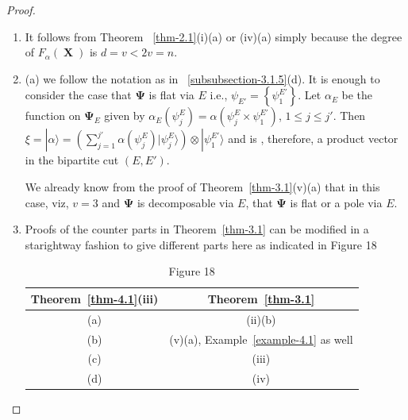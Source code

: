 \documentclass[a4paper,12pt]{article}
\DeclareMathOperator{\x}{\mathrm{X}}
\theoremstyle{definition}
\theoremstyle{underlinethm}
\theoremstyle{definition}
\begin{document}
\begin{proof}
\begin{enumerate}[label=(\roman*)]
\item It follows from Theorem ~\eqref{thm-2.1}(i)(a) or (iv)(a) simply because the degree of $F_{\alpha}(\boldsymbol{\x})$ is $d=v < 2v = n$.

\item (a) we follow the notation as in ~\eqref{subsubsection-3.1.5}(d). It is enough to consider the case that $\boldsymbol{\Psi}$ is flat via $E$ i.e., $\psi_{E'}= \left\{\psi^{E'}_{1}\right\}$. Let $\alpha_{E}$ be the function on $\boldsymbol{\Psi}_{E}$ given by $\alpha_{E}\left(\psi_{j}^{E}\right) = \alpha\left(\psi_{j}^{E} \times \psi_{1}^{E'}\right)$, $1 \leq j \leq j'$. Then $\xi = | \alpha \rangle = \left(\sum\limits_{j=1}^{j'} \alpha(\psi_{j}^{E}) | \psi_{j}^{E} \rangle \right) \otimes | \psi_{1}^{E'} \rangle$ and is , therefore, a product vector in the bipartite cut $(E, E')$.

We already know from the proof of Theorem~\eqref{thm-3.1}(v)(a) that in this case, viz, $v=3$ and $\boldsymbol{\Psi}$ is decomposable via $E$, that $\boldsymbol{\Psi}$ is flat or a pole via $E$.

\item Proofs of the counter parts in Theorem~\eqref{thm-3.1} can be modified in a starightway fashion to give different parts here as indicated in Figure 18

\begin{table}
\begin{center}
\begin{tabular}{c|c}
Theorem~\eqref{thm-4.1}(iii) & Theorem~\eqref{thm-3.1}\\[4pt]
\hline
(a) & (ii)(b)\\[4pt]
\hline
(b) & (v)(a), Example~\eqref{example-4.1} as well\\[4pt]
\hline
(c) & (iii)\\[4pt]
\hline
(d) & (iv)
\end{tabular}
\end{center}
\caption*{Figure 18}\label{fig018}
\end{table}



\end{enumerate}
\end{proof}
\end{document}
